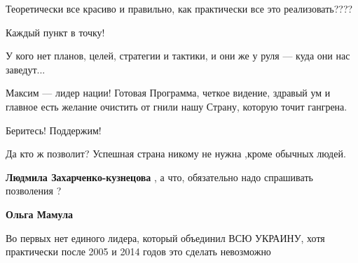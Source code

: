 \begin{itemize}
Теоретически все красиво и правильно, как практически все это реализовать????

 
Каждый пункт в точку!

 

У кого нет планов, целей, стратегии и тактики, и они же у руля — куда они нас
заведут...

Максим — лидер нации! Готовая Программа, четкое видение, здравый ум и главное
есть желание очистить от гнили нашу Страну, которую точит гангрена.

Беритесь! Поддержим!

 

Да кто ж позволит? Успешная страна никому не нужна ,кроме обычных людей.

\begin{itemize}
 
\textbf{Людмила Захарченко-кузнецова} , а что, обязательно надо спрашивать позволения ?

 
\textbf{Ольга Мамула} 

Во первых нет единого лидера, который объединил ВСЮ УКРАИНУ, хотя практически
после 2005 и 2014 годов это сделать невозможно


\end{itemize}
\end{itemize}
